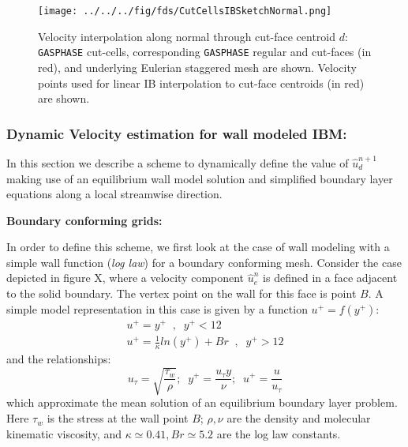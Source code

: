 \documentclass[12pt]{article}
\begin{document}
\begin{figure}[h]
      \centering
      \texttt{[image: ../../../fig/fds/CutCellsIBSketchNormal.png]}
      \caption{Velocity interpolation along normal through cut-face centroid $d$: \texttt{GASPHASE} cut-cells,  corresponding \texttt{GASPHASE} regular and cut-faces (in red), and underlying Eulerian staggered mesh are shown. Velocity points used for linear IB interpolation to cut-face centroids (in red) are shown. }
	\label{Fig:IBCart}
\end{figure}


\subsubsection{Dynamic Velocity estimation for wall modeled IBM:}

In this section we describe a scheme to dynamically define the value of $\hat{u}_d^{n+1}$ making use of an equilibrium wall model solution and simplified boundary layer equations along a local streamwise direction. 

\bigskip
\noindent 
\textbf{Boundary conforming grids:}
\bigskip

In order to define this scheme, we first look at the case of wall modeling with a simple wall function (\textit{log law}) for a boundary conforming mesh. Consider the case depicted in figure X, where a velocity component $\hat{u}_e^n$ is defined in a face adjacent to the solid boundary. The vertex point on the wall for this face is point $B$. A simple model representation in this case is given by a function $u^+ = f(y^+)$:
%
\begin{eqnarray}
   u^+ = y^+ \; \; , \; \; y^+ < 12 \\
   u^+ = \frac{1}{\kappa} ln(y^+) + Br \; \; , \; \; y^+ > 12
\end{eqnarray}
%
and the relationships:
%
\begin{equation}
   u_\tau = \sqrt{\frac{\tau_w}{\rho}}; \; \; y^+= \frac{u_\tau y}{\nu}; \; \; u^+=\frac{u}{u_\tau}
\end{equation}
%
which approximate the mean solution of an equilibrium boundary layer problem. Here $\tau_w$ is the stress at the wall point $B$; $\rho, \nu$ are the density and molecular kinematic viscosity, and $\kappa \simeq 0.41, Br \simeq 5.2$ are the log law constants.
\end{document}
